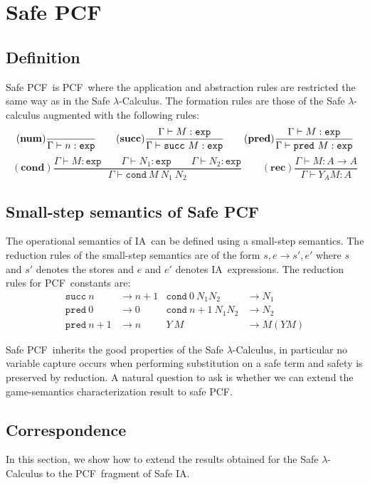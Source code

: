 \documentclass{llncs}
\newcommand\dps{\displaystyle}
\newcommand\rulef[2]{\frac{\dps #1}{#2}}
\newcommand{\rulename}[1]{\mathbf{(#1)}}
\newcommand\ialgol{\textsf{IA}}
\newcommand\pcf{\textsf{PCF}}
\newcommand\pcfcond{\texttt{cond}}
\newcommand\pcfsucc{\texttt{succ}}
\newcommand\pcfpred{\texttt{pred}}
\begin{document}
\section{Safe \pcf}

\subsection{Definition}
Safe \pcf\ is \pcf\ where the application and abstraction rules are restricted the same
way as in the Safe $\lambda$-Calculus. The formation rules are those of the Safe $\lambda$-calculus augmented with the following rules:
$$ \rulename{num} \rulef{}{\Gamma \vdash n :\texttt{exp}}
\qquad \rulename{succ} \rulef{\Gamma \vdash M:\texttt{exp} }{\Gamma
\vdash \texttt{succ}\ M:\texttt{exp}} \qquad \rulename{pred}
\rulef{\Gamma \vdash M:\texttt{exp} }{\Gamma \vdash \texttt{pred}\
M:\texttt{exp}}$$
$$
\rulename{cond} \rulef{\Gamma \vdash M : \texttt{exp} \qquad \Gamma
\vdash N_1 : \texttt{exp} \qquad \Gamma \vdash N_2 : \texttt{exp}
}{\Gamma \vdash \texttt{cond}\ M\ N_1\ N_2} \qquad  \rulename{rec}
\rulef{\Gamma \vdash M : A\rightarrow A }{ \Gamma \vdash Y_A M :
A}$$

\subsection{Small-step semantics of Safe \pcf}
The operational semantics of \ialgol\ can be defined using a small-step semantics.
The reduction rules of the small-step semantics are of the form $s,e
\rightarrow s',e'$ where $s$ and $s'$ denotes the stores and $e$ and
$e'$ denotes \ialgol\ expressions. The reduction rules for \pcf\ constants are:
\begin{align*}
\pcfsucc\ n &\rightarrow n+1 &                   \pcfcond\ 0\ N_1 N_2 &\rightarrow N_1 \\
\pcfpred\ 0 &\rightarrow 0   &                   \pcfcond\ n+1\ N_1 N_2 &\rightarrow N_2 \\
\pcfpred\ n+1 &\rightarrow n &                   Y\ M &\rightarrow M (Y M)
\end{align*}

Safe \pcf\ inherits the good properties of the Safe $\lambda$-Calculus, in particular
no variable capture occurs when performing substitution on a safe term
and safety is preserved by reduction.
A natural question to ask is whether we can extend the game-semantics characterization result
to safe \pcf.


\subsection{Correspondence}
In this section, we show how to extend the results obtained for the
Safe $\lambda$-Calculus to the \pcf\ fragment of Safe \ialgol.
\end{document}
